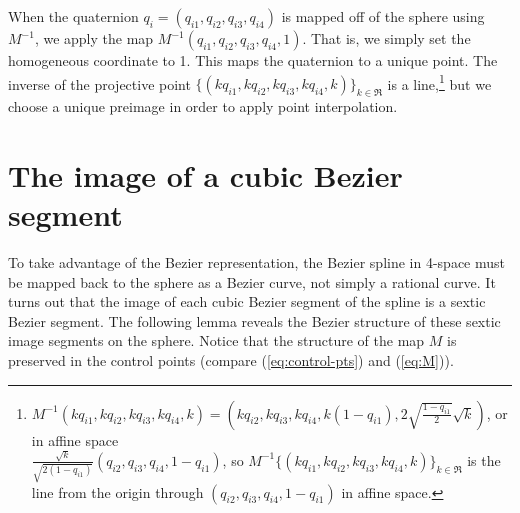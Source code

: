 When the quaternion $q_i = (q_{i1},q_{i2},q_{i3},q_{i4})$ is mapped off
of the sphere using $M^{-1}$,
we apply the map $M^{-1}(q_{i1},q_{i2},q_{i3},q_{i4},1)$.
That is, we simply set the homogeneous coordinate to 1.
This maps the quaternion to a unique point.
The inverse of the projective point 
$\{(kq_{i1},kq_{i2},kq_{i3},kq_{i4},k)\}_{k \in \Re}$
is a line,\footnote{$M^{-1}(kq_{i1},kq_{i2},kq_{i3},kq_{i4},k) = 
	(kq_{i2},kq_{i3},kq_{i4},k(1-q_{i1}),2\sqrt{\frac{1-q_{i1}}{2}} \sqrt{k})$, 
	or in affine space \\
	$\frac{\sqrt{k}}{\sqrt{2(1-q_{i1})}} (q_{i2},q_{i3},q_{i4},1-q_{i1})$,
	so $M^{-1}\{(kq_{i1},kq_{i2},kq_{i3},kq_{i4},k)\}_{k \in \Re}$
	is the line from the origin through $(q_{i2},q_{i3},q_{i4},1-q_{i1})$ 
	in affine space.}
but we choose a unique preimage in order to apply point interpolation.

\section{The image of a cubic Bezier segment}
\label{sec:sextic}

To take advantage of the Bezier representation,
the Bezier spline in 4-space must be mapped back to the sphere
as a Bezier curve, not simply a rational curve.
It turns out that the image of each cubic Bezier segment of the spline
is a sextic Bezier segment.
The following lemma reveals the Bezier structure of these sextic
image segments on the sphere.
Notice that the structure of the map $M$ is preserved in the control
points (compare (\ref{eq:control-pts}) and (\ref{eq:M})).

